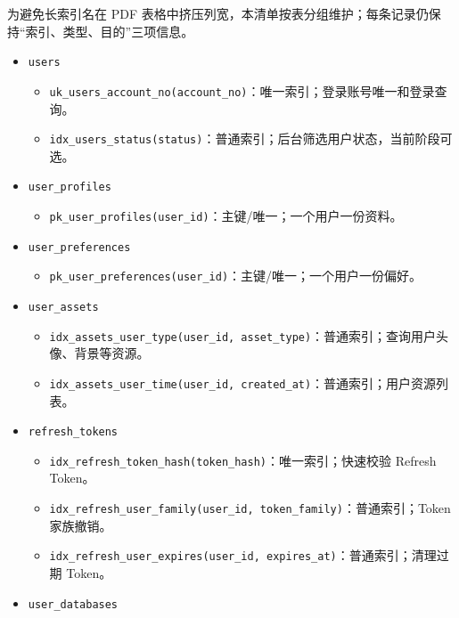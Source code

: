 \documentclass[
  a4paper,
  UTF8]{ctexart}
\providecommand{\tightlist}{%
  \setlength{\itemsep}{0pt}\setlength{\parskip}{0pt}}
\begin{document}
为避免长索引名在 PDF
表格中挤压列宽，本清单按表分组维护；每条记录仍保持``索引、类型、目的''三项信息。

\begin{itemize}
\tightlist
\item
  \texttt{users}

  \begin{itemize}
  \tightlist
  \item
    \texttt{uk\_users\_account\_no(account\_no)}：唯一索引；登录账号唯一和登录查询。
  \item
    \texttt{idx\_users\_status(status)}：普通索引；后台筛选用户状态，当前阶段可选。
  \end{itemize}
\item
  \texttt{user\_profiles}

  \begin{itemize}
  \tightlist
  \item
    \texttt{pk\_user\_profiles(user\_id)}：主键/唯一；一个用户一份资料。
  \end{itemize}
\item
  \texttt{user\_preferences}

  \begin{itemize}
  \tightlist
  \item
    \texttt{pk\_user\_preferences(user\_id)}：主键/唯一；一个用户一份偏好。
  \end{itemize}
\item
  \texttt{user\_assets}

  \begin{itemize}
  \tightlist
  \item
    \texttt{idx\_assets\_user\_type(user\_id,\ asset\_type)}：普通索引；查询用户头像、背景等资源。
  \item
    \texttt{idx\_assets\_user\_time(user\_id,\ created\_at)}：普通索引；用户资源列表。
  \end{itemize}
\item
  \texttt{refresh\_tokens}

  \begin{itemize}
  \tightlist
  \item
    \texttt{idx\_refresh\_token\_hash(token\_hash)}：唯一索引；快速校验
    Refresh Token。
  \item
    \texttt{idx\_refresh\_user\_family(user\_id,\ token\_family)}：普通索引；Token
    家族撤销。
  \item
    \texttt{idx\_refresh\_user\_expires(user\_id,\ expires\_at)}：普通索引；清理过期
    Token。
  \end{itemize}
\item
  \texttt{user\_databases}


\end{itemize}
\end{document}
